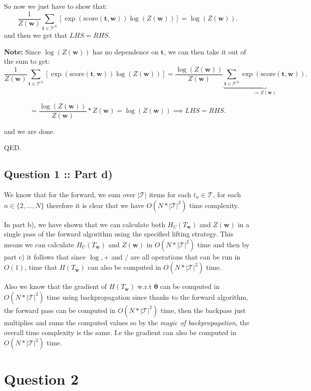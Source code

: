 \documentclass[a4paper]{article}
\begin{document}
So now we just have to show that:
\[
    \frac{1}{Z(\bm{w})} \sum_{\bm{t} \in \mathcal{T}^N} \left[ \exp(\text{score}(\bm{t}, \bm{w})) \log(Z(\bm{w})) \right] = \log(Z(\bm{w}))
.\]
and then we get that $LHS = RHS$.

 \textbf{Note:} Since $\log(Z(\bm{w}))$ has no dependence on $\bm{t}$, we can then take it out of the sum to get:
 \[
    \frac{1}{Z(\bm{w})} \sum_{\bm{t} \in \mathcal{T}^N} \left[ \exp(\text{score}(\bm{t}, \bm{w})) \log(Z(\bm{w})) \right] = \frac{\log(Z(\bm{w}))}{Z(\bm{w})} \underbrace{\sum_{\bm{t} \in \mathcal{T}^N} \exp(\text{score}(\bm{t}, \bm{w}))}_{:= Z(\bm{w})}
 .\]

\[
= \frac{\log(Z(\bm{w}))}{Z(\bm{w})} * Z(\bm{w}) = \log(Z(\bm{w})) \implies LHS = RHS
.\]

and we are done.

QED.

\subsection*{Question 1 :: Part d)}
We know that for the forward, we sum over $\left| \mathcal{T} \right| $ items
for each $t_n \in \mathcal{T}$, for each $n \in \{2, ..., N\} $ 
therefore it is clear that we have $O(N * \left| \mathcal{T} \right|^2)$ time complexity.

In part b), we have shown that we can calculate both $H_U(T_{\bm{w}})$ and $Z(\bm{w})$ in a single
pass of the forward algorithm using the specified lifting strategy. This means
we can calculate $H_U(T_{\bm{w}})$ and $Z(\bm{w})$ in $O(N * \left| \mathcal{T} \right| ^2)$ time
and then by part c) it follows that since $\log, +$ and $/$ are all operations that can be run in  $O(1)$, time
that  $H(T_{\bm{w}})$ can also be computed in $O(N * \left| \mathcal{T} \right| ^2)$ time.

Also we know that the gradient of $H(T_{\bm{w}})$ w.r.t $\bm{\theta}$ can be computed
in $O(N * \left| \mathcal{T}\right| ^2)$ time using backpropagation since thanks to 
the forward algorithm, the forward pass can be computed in $O(N * \left| \mathcal{T} \right| ^2)$ time, then the backpass just multiplies and sums
the computed values so by the \textit{magic of backpropagation}, the overall time complexity is the same.
I.e the gradient can also be computed in $O(N * \left| \mathcal{T} \right| ^2)$ time.


\section*{Question 2}
\end{document}
